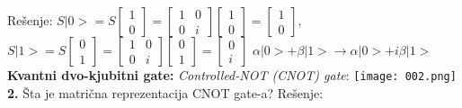 \documentclass{article}
\begin{document}
Rešenje: \vspace{0.2cm}\newline
$S|0> = S\begin{bmatrix}
    1\\
    0
\end{bmatrix} = \begin{bmatrix}
    1 & 0\\
    0 & i
\end{bmatrix}\begin{bmatrix}
    1\\
    0
\end{bmatrix} = \begin{bmatrix}
    1\\
    0
\end{bmatrix}$, \hspace*{0.2cm}
$S|1> = S\begin{bmatrix}
    0\\
    1
\end{bmatrix} = \begin{bmatrix}
    1 & 0\\
    0 & i
\end{bmatrix}\begin{bmatrix}
    0\\
    1
\end{bmatrix} = \begin{bmatrix}
    0\\
    i
\end{bmatrix}$
\vspace{0.1cm}\newline
\Rightarrow 
$\alpha|0> + \beta|1> \longrightarrow \alpha|0> + i\beta|1>$
\vspace{0.5cm}\newline
\textbf{Kvantni dvo-kjubitni gate:}
\vspace{0.2cm}\newline
\textit{Controlled-NOT (CNOT) gate}:
\newline\texttt{[image: 002.png]}
\vspace{2cm}\newline
\textbf{2.} Šta je matrična reprezentacija CNOT gate-a?
\vspace*{0.4cm}\newline
Rešenje: \vspace{0.2cm}\newline
\end{document}
